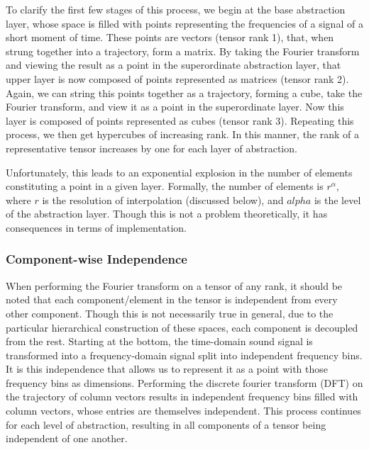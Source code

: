\documentclass[runningheads]{llncs}
\begin{document}
To clarify the first few stages of this process, we begin at the base abstraction layer, whose space is filled with points representing the frequencies of a signal of a short moment of time.  These points are vectors (tensor rank 1), that, when strung together into a trajectory, form a matrix.  By taking the Fourier transform and viewing the result as a point in the superordinate abstraction layer, that upper layer is now composed of points represented as matrices (tensor rank 2).  Again, we can string this points together as a trajectory, forming a cube, take the Fourier transform, and view it as a point in the superordinate layer.  Now this layer is composed of points represented as cubes (tensor rank 3). Repeating this process, we then get hypercubes of increasing rank.  In this manner, the rank of a representative tensor increases by one for each layer of abstraction. 

Unfortunately, this leads to an exponential explosion in the number of elements constituting a point in a given layer.  Formally, the number of elements is $r^\alpha$, where $r$ is the resolution of interpolation (discussed below), and $alpha$ is the level of the abstraction layer.  Though this is not a problem theoretically, it has consequences in terms of implementation.


\subsubsection{Component-wise Independence}

When performing the Fourier transform on a tensor of any rank, it should be noted that each component/element in the tensor is independent from every other component.  Though this is not necessarily true in general, due to the particular hierarchical construction of these spaces, each component is decoupled from the rest.  Starting at the bottom, the time-domain sound signal is transformed into a frequency-domain signal split into independent frequency bins.  It is this independence that allows us to represent it as a point with those frequency bins as dimensions.  Performing the discrete fourier transform (DFT) on the trajectory of column vectors results in independent frequency bins filled with column vectors, whose entries are themselves independent.  This process continues for each level of abstraction, resulting in all components of a tensor being independent of one another.
\end{document}
